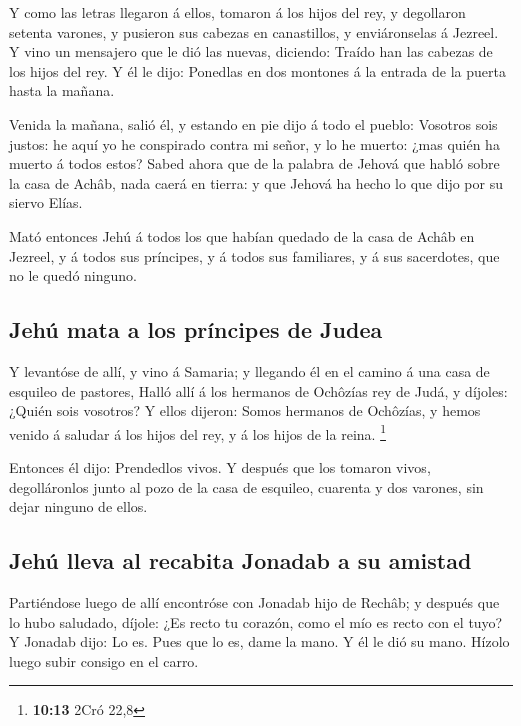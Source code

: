  Y como las letras llegaron á ellos, tomaron á los hijos del
rey, y degollaron setenta varones, y pusieron sus cabezas en
canastillos, y enviáronselas á Jezreel.  Y vino un mensajero
que le dió las nuevas, diciendo: Traído han las cabezas de los hijos del
rey. Y él le dijo: Ponedlas en dos montones á la entrada de la puerta
hasta la mañana.

 Venida la mañana, salió él, y estando en pie dijo á todo el
pueblo: Vosotros sois justos: he aquí yo he conspirado contra mi señor,
y lo he muerto: ¿mas quién ha muerto á todos estos?  Sabed
ahora que de la palabra de Jehová que habló sobre la casa de Achâb, nada
caerá en tierra: y que Jehová ha hecho lo que dijo por su siervo Elías.

 Mató entonces Jehú á todos los que habían quedado de la
casa de Achâb en Jezreel, y á todos sus príncipes, y á todos sus
familiares, y á sus sacerdotes, que no le quedó ninguno.

\hypertarget{jehuxfa-mata-a-los-pruxedncipes-de-judea}{%
\subsection{Jehú mata a los príncipes de
Judea}\label{jehuxfa-mata-a-los-pruxedncipes-de-judea}}

 Y levantóse de allí, y vino á Samaria; y llegando él en el
camino á una casa de esquileo de pastores,  Halló allí á
los hermanos de Ochôzías rey de Judá, y díjoles: ¿Quién sois vosotros? Y
ellos dijeron: Somos hermanos de Ochôzías, y hemos venido á saludar á
los hijos del rey, y á los hijos de la reina. \footnote{\textbf{10:13}
  2Cró 22,8}

 Entonces él dijo: Prendedlos vivos. Y después que los
tomaron vivos, degolláronlos junto al pozo de la casa de esquileo,
cuarenta y dos varones, sin dejar ninguno de ellos.

\hypertarget{jehuxfa-lleva-al-recabita-jonadab-a-su-amistad}{%
\subsection{Jehú lleva al recabita Jonadab a su
amistad}\label{jehuxfa-lleva-al-recabita-jonadab-a-su-amistad}}

 Partiéndose luego de allí encontróse con Jonadab hijo de
Rechâb; y después que lo hubo saludado, díjole: ¿Es recto tu corazón,
como el mío es recto con el tuyo? Y Jonadab dijo: Lo es. Pues que lo es,
dame la mano. Y él le dió su mano. Hízolo luego subir consigo en el
carro.

